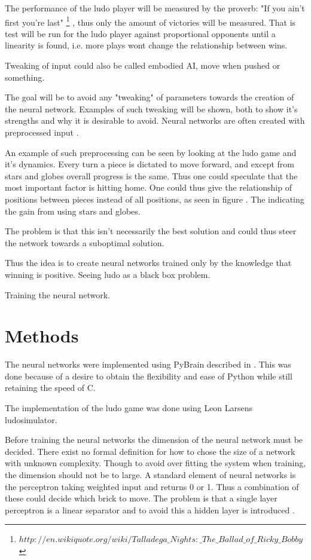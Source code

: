 \documentclass{llncs}
\begin{document}
The performance of the ludo player will be measured by the proverb: "If you ain't first you're last" \footnote{ $http://en.wikiquote.org/wiki/Talladega\_Nights:\_The\_Ballad\_of\_Ricky\_Bobby$}
, thus only the amount of victories will be measured. That is test will be run for the ludo player against proportional opponents until a linearity is found, i.e. more plays wont change the relationship between wins.

Tweaking of input could also be called embodied AI, move when pushed or something.


The goal will be to avoid any "tweaking" of parameters towards the creation of the neural network. Examples of such tweaking will be shown, both to show it's strengths and why it is desirable to avoid. Neural networks are often created with preprocessed input \cite{NeuronOnline}. 

An example of such preprocessing can be seen by looking at the ludo game and it's dynamics. Every turn a piece is dictated to move forward, and except from stars and globes overall progress is the same. Thus one could speculate that the most important factor is hitting home. One could thus give the relationship  of positions between pieces instead of all positions, as seen in figure%
. The indicating the gain from using stars and globes.


The problem is that this isn't necessarily the best solution and could thus steer the network towards a suboptimal solution. 



Thus the idea is to create neural networks trained only by the knowledge that winning is positive. Seeing ludo as a black box problem.



Training the neural network.

\section*{Methods} %


The neural networks were implemented using PyBrain described in \cite{schaul2010}. This was done because of a desire to obtain the flexibility and ease of Python while still retaining the speed of C. 

The implementation of the ludo game was done using Leon Larsens ludosimulator.

Before training the neural networks the dimension of the neural network must be decided. There exist no formal definition for how to chose the size of a network with unknown complexity. Though to avoid over fitting the system when training, the dimension should not be to large. A standard element of neural networks is the perceptron taking weighted input and returns 0 or 1. Thus a combination of these could decide which brick to move. The problem is that a single layer perceptron is a linear separator and to avoid this a hidden layer is introduced \cite{Russell}.
\end{document}
